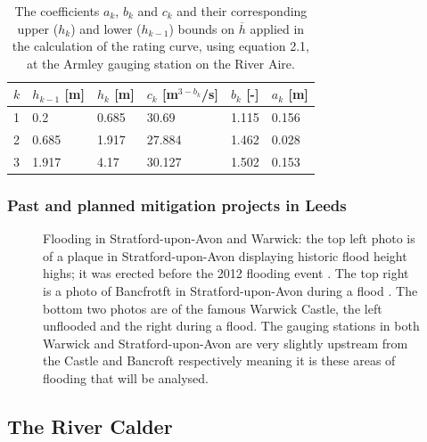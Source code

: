 \documentclass[11pt,a4paper]{article}
\begin{document}
\begin{table}[H]
\centering
\begin{tabular}{l|l|l|l|l|l}
$k$ & $h_{k-1}$ [m] & $h_k$ [m] & $c_k$ [m$^{3-b_k}$/s] & $b_k$ [-] & $a_k$ [m]\\
\hline
1 & 0.2 & 0.685 & 30.69 & 1.115 & 0.156 \\
2 & 0.685 & 1.917 & 27.884 & 1.462 & 0.028 \\
3 & 1.917 & 4.17 & 30.127 & 1.502 & 0.153 \\
\end{tabular}
\caption{The coefficients $a_k$, $b_k$ and $c_k$ and their corresponding upper ($h_k$) and lower ($h_{k-1}$) bounds on $\overline{h}$ \cite{Aire} applied in the calculation of the rating curve, using equation 2.1, at the Armley gauging station on the River Aire.}
\end{table}

\subsubsection{Past and planned mitigation projects in Leeds}
\begin{figure}[H]
\centering
{}
\hfill
{}
\caption{Flooding in Stratford-upon-Avon and Warwick: the top left photo is of a plaque in Stratford-upon-Avon displaying historic flood height highs{;} it was erected before the 2012 flooding event \cite{plaque}. The top right is a photo of Bancfrotft in Stratford-upon-Avon during a flood \cite{strat-flood}. The bottom two photos are of the famous Warwick Castle, the left \cite{castle} unflooded and the right \cite{warwick-flooding} during a flood. The gauging stations in both Warwick and Stratford-upon-Avon are very slightly upstream from the Castle and Bancroft respectively meaning it is these areas of flooding that will be analysed.}
\end{figure}

\subsection{The River Calder}
\end{document}
